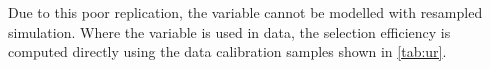 Due to this poor replication,  the \dllpk variable cannot be modelled with resampled simulation. Where the variable is used in data, the selection efficiency is computed directly using the data calibration samples shown in \autoref{tab:ur}.




  




\FloatBarrier
